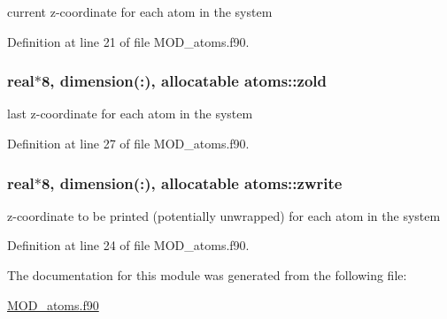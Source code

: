 current z-\/coordinate for each atom in the system 



Definition at line 21 of file M\-O\-D\-\_\-atoms.\-f90.

\hypertarget{classatoms_a88cfaf892614a84f207c1b54225a04dc}{
\subsubsection[{zold}]{\setlength{\rightskip}{0pt plus 5cm}real$\ast$8, dimension(\-:), allocatable atoms\-::zold}}\label{classatoms_a88cfaf892614a84f207c1b54225a04dc}


last z-\/coordinate for each atom in the system 



Definition at line 27 of file M\-O\-D\-\_\-atoms.\-f90.

\hypertarget{classatoms_a9653bdbdc3d996894be437900f1361f3}{
\subsubsection[{zwrite}]{\setlength{\rightskip}{0pt plus 5cm}real$\ast$8, dimension(\-:), allocatable atoms\-::zwrite}}\label{classatoms_a9653bdbdc3d996894be437900f1361f3}


z-\/coordinate to be printed (potentially unwrapped) for each atom in the system 



Definition at line 24 of file M\-O\-D\-\_\-atoms.\-f90.



The documentation for this module was generated from the following file\-:\begin{DoxyCompactItemize}
\item 
\hyperlink{MOD__atoms_8f90}{M\-O\-D\-\_\-atoms.\-f90}\end{DoxyCompactItemize}

